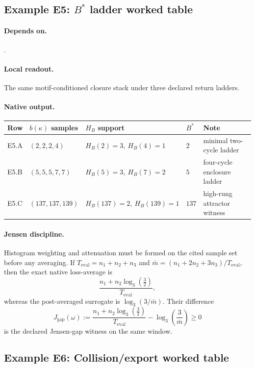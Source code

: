 \subsection{Example E5: \texorpdfstring{$B^*$}{B*} ladder worked table}\label{ex:e5}
\paragraph{Depends on.} .
\paragraph{Local readout.} The same motif-conditioned closure stack under three declared return ladders.
\paragraph{Native output.}
{\footnotesize
\begin{center}
\begin{tabular}{@{}lllll@{}}
\toprule
Row & $b(\kappa)$ samples & $H_B$ support & $B^*$ & Note \\
\midrule
E5.A & $(2,2,2,4)$ & $H_B(2)=3,\ H_B(4)=1$ & $2$ & minimal two-cycle ladder \\
E5.B & $(5,5,5,7,7)$ & $H_B(5)=3,\ H_B(7)=2$ & $5$ & four-cycle enclosure ladder \\
E5.C & $(137,137,139)$ & $H_B(137)=2,\ H_B(139)=1$ & $137$ & high-rung attractor witness \\
\bottomrule
\end{tabular}
\end{center}}
\paragraph{Jensen discipline.} Histogram weighting and attenuation must be formed on the cited sample set before any averaging. If $T_{\mathrm{eval}}=n_1+n_2+n_3$ and $\bar m=(n_1+2n_2+3n_3)/T_{\mathrm{eval}}$, then the exact native loss-average is
\[
\frac{n_1+n_2\log_3\!\left(\frac{3}{2}\right)}{T_{\mathrm{eval}}},
\]
whereas the post-averaged surrogate is $\log_3(3/\bar m)$. Their difference
\[
J_{\mathrm{gap}}(\omega):=
\frac{n_1+n_2\log_3\!\left(\frac{3}{2}\right)}{T_{\mathrm{eval}}}-\log_3\!\left(\frac{3}{\bar m}\right)\ge 0
\]
is the declared Jensen-gap witness on the same window.

\subsection{Example E6: Collision/export worked table}\label{ex:e6}
